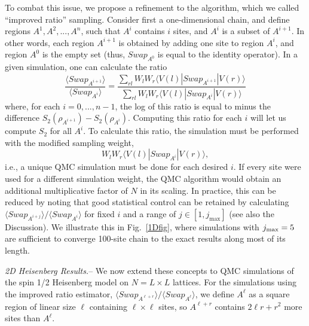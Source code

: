 \documentclass[prl,aps,twocolumn,floatfix,amsmath,amssymb,superscriptaddress,tightenlines]{revtex4}
\begin{document}
To combat this issue, we propose a refinement to the algorithm, which we called ``improved ratio'' sampling.
Consider first a one-dimensional chain, and define regions $A^1,A^2,...,A^n$, such
that $A^i$ contains $i$ sites, and $A^i$ is a subset of $A^{i+1}$.  In other words, each region $A^{i+1}$ is obtained by adding one site to region
$A^{i}$, and region $A^0$ is the empty set (thus, $Swap_{A^0}$ is equal to the identity operator).
In a given simulation, one can calculate the ratio
\begin{equation}
\frac{\langle Swap_{A^{i+1}}\rangle}{\langle Swap_{A^{i}}\rangle}
= \frac{\sum_{rl} W_l W_r \langle V(l) | Swap_{A^{i+1}} | V(r) \rangle} {\sum_{rl} W_l W_r \langle V(l) | Swap_{A^i} | V(r) \rangle}
\label{Ratio}
\end{equation}
where, for each $i=0,...,n-1$, the log of this ratio is equal to minus the difference $S_2(\rho_{A^{i+1}})-S_2(\rho_{A^{i}})$.
Computing this ratio for each $i$ will let us compute $S_2$ for all $A^i$.  To calculate this ratio, the simulation must be performed 
with the modified sampling weight,
\begin{equation}
W_l W_r \langle V(l) | Swap_{A^i} | V(r) \rangle,
\end{equation}
i.e., a unique QMC simulation must be done for each desired $i$.  %
If every site were used for a different simulation weight, the QMC algorithm would obtain an additional multiplicative factor of $N$ in its scaling.
In practice, 
this can be reduced by noting that good statistical control can be retained by calculating 
${\langle Swap_{A^{i+j}}\rangle}/{\langle Swap_{A^{i}}\rangle}$ for fixed $i$ and a range of $j \in [1,j_{\max}]$ (see also the Discussion).  We illustrate this in Fig.~\ref{1Dfig},
where simulations with $j_{\rm max}=5$ are sufficient to converge 100-site chain to the exact results along most of its length.

{\it 2D Heisenberg Results.}-- We now extend these concepts to QMC simulations of the spin 1/2 Heisenberg model on $N=L \times L$ lattices.  
For the simulations using the improved ratio estimator, 
${\langle Swap_{A^{\ell+r}}\rangle}/{\langle Swap_{A^{\ell}}\rangle}$,
we define $A^\ell$ as a square region of linear size $\ell$ containing $\ell \times \ell$ sites, so
$A^{\ell+r}$ contains $2\ell r+r^2$ more sites than $A^{\ell}$.
\end{document}
